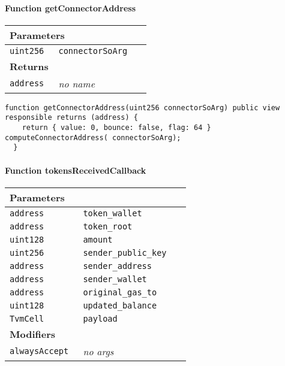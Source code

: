 \paragraph{Function getConnectorAddress}


\ifsoltables
\noindent\begin{tabular}{|l|l|p{5cm}|}\hline
\multicolumn{3}{|l|}{\bf Parameters}\\\hline
\tt uint256 & \tt connectorSoArg &\\\hline
\multicolumn{3}{|l|}{\bf Returns}\\\hline
\tt address & {\em no name} &\\\hline
\end{tabular}
\fi

\vspace{2cm}

\begin{lstlisting}[firstnumber=108]
  function getConnectorAddress(uint256 connectorSoArg) public view responsible returns (address) {
    return { value: 0, bounce: false, flag: 64 } computeConnectorAddress( connectorSoArg);
  }
\end{lstlisting}

\paragraph{Function tokensReceivedCallback}


\ifsoltables
\noindent\begin{tabular}{|l|l|p{5cm}|}\hline
\multicolumn{3}{|l|}{\bf Parameters}\\\hline
\tt address & \tt token\_{}wallet &\\\hline
\tt address & \tt token\_{}root &\\\hline
\tt uint128 & \tt amount &\\\hline
\tt uint256 & \tt sender\_{}public\_{}key &\\\hline
\tt address & \tt sender\_{}address &\\\hline
\tt address & \tt sender\_{}wallet &\\\hline
\tt address & \tt original\_{}gas\_{}to &\\\hline
\tt uint128 & \tt updated\_{}balance &\\\hline
\tt TvmCell & \tt payload &\\\hline
\multicolumn{3}{|l|}{\bf Modifiers}\\\hline
\tt alwaysAccept & {\em no args} &\\\hline
\end{tabular}
\fi

